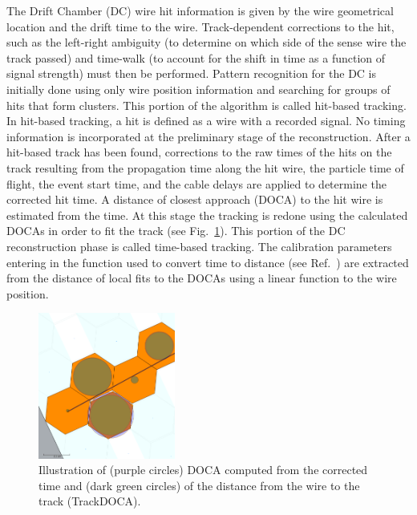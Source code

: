 The Drift Chamber (DC) wire hit information is given by the wire geometrical location and the drift time to the
wire. Track-dependent corrections to the hit, such as the left-right ambiguity (to determine on which side of the
sense wire the track passed) and time-walk (to account for the shift in time as a function of signal strength)
must then be performed. Pattern recognition for the DC is initially done using only wire position information and
searching for groups of hits that form clusters. This portion of the algorithm is called hit-based tracking.  In
hit-based tracking, a hit is defined as a wire with a recorded signal. No timing information is incorporated at the
preliminary stage of the reconstruction. After a hit-based track has been found, corrections to the raw times of
the hits on the track resulting from the propagation time along the hit wire, the particle time of flight, the event start
time, and the cable delays are applied to determine the corrected hit time. A distance of closest approach (DOCA)
to the hit wire is estimated from the time. At this stage the tracking is redone using the calculated DOCAs in order
to fit the track (see Fig.~\ref{fig:docas}). This portion of the DC reconstruction phase is called time-based tracking.
The calibration parameters entering in the function used to convert time to distance (see Ref.~\cite{dc-nim}) are
extracted from the distance of local fits to the DOCAs using a linear function to the wire position. 

\begin{figure}
\centering
\includegraphics[width=0.4\textwidth]{pics/dcPattern10.png}
\caption{Illustration of (purple circles) DOCA computed from the corrected time and (dark green circles) of the distance from the wire to the track
  (TrackDOCA).}
\label{fig:docas}
\end{figure}

